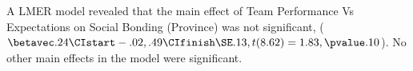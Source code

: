 \begin{CJK}{UTF8}{gbsn}








A LMER model revealed that the main effect of Team Performance Vs Expectations on Social Bonding (Province) was not significant, ($\betavec .24 \CIstart -.02, .49 \CIfinish \SE .13, t(8.62) = 1.83, \pvalue .10$). No other main effects in the model were significant.


\end{CJK}
